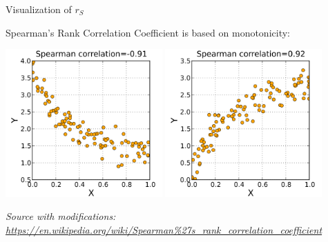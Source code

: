 \documentclass{beamer}
\begin{document}
\begin{frame}
{\centerline{Visualization of $r_S$}}

Spearman's Rank Correlation Coefficient is based on monotonicity:

\begin{center}
\includegraphics[width=0.45\textwidth]{P2023.AIBCCSS.InferenceAndLogisticRegression/600px-Spearman_fig4.png}
\includegraphics[width=0.45\textwidth]{P2023.AIBCCSS.InferenceAndLogisticRegression/600px-Spearman_fig5.png}
\end{center} 

\textit{\tiny
\vspace{-\baselineskip}
Source with modifications: \url{https://en.wikipedia.org/wiki/Spearman\%27s_rank_correlation_coefficient}}

\end{frame}
\end{document}
